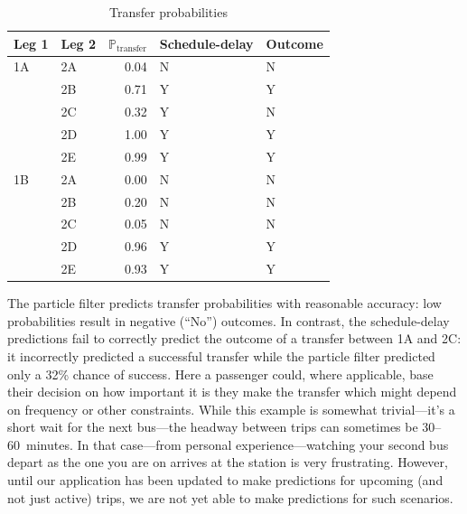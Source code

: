 \begin{knitrout}\small
{}\color{fgcolor}\begin{table}

\caption{\label{tab:eta_journey_transfer_res}Transfer probabilities}
\centering
\fontsize{8}{10}\selectfont
\begin{tabular}[t]{llrll}
\toprule
Leg 1 & Leg 2 & $\mathbb{P}_\text{transfer}$ & Schedule-delay & Outcome\\
\midrule
1A & 2A & 0.04 & N & N\\
 & 2B & 0.71 & Y & Y\\
 & 2C & 0.32 & Y & N\\
 & 2D & 1.00 & Y & Y\\
 & 2E & 0.99 & Y & Y\\
\midrule
1B & 2A & 0.00 & N & N\\
 & 2B & 0.20 & N & N\\
 & 2C & 0.05 & N & N\\
 & 2D & 0.96 & Y & Y\\
 & 2E & 0.93 & Y & Y\\
\bottomrule
\end{tabular}
\end{table}


\end{knitrout}


The particle filter predicts transfer probabilities with reasonable accuracy: low probabilities result in negative (``No'') outcomes. In contrast, the schedule-delay predictions fail to correctly predict the outcome of a transfer between 1A and 2C: it incorrectly predicted a successful transfer while the particle filter predicted only a 32\% chance of success. Here a passenger could, where applicable, base their decision on how important it is they make the transfer which might depend on frequency or other constraints. While this example is somewhat trivial---it's a short wait for the next bus---the headway between trips can sometimes be 30--60~minutes. In that case---from personal experience---watching your second bus depart as the one you are on arrives at the station is very frustrating. However, until our application has been updated to make predictions for upcoming (and not just active) trips, we are not yet able to make predictions for such scenarios.


